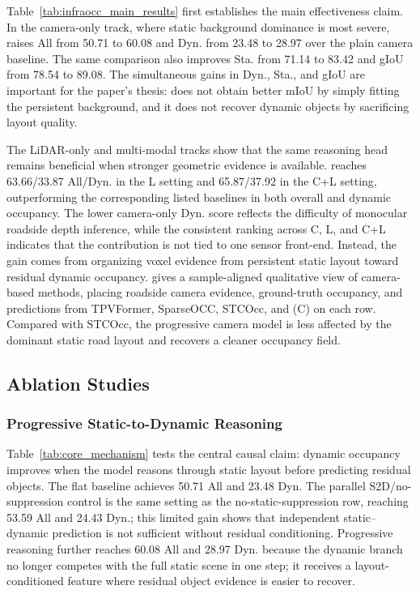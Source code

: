 Table~\ref{tab:infraocc_main_results} first establishes the main effectiveness
claim. In the camera-only track, where static background dominance is most
severe, \nameplus{} raises All from 50.71 to 60.08 and Dyn. from 23.48 to
28.97 over the plain camera baseline. The same comparison also improves Sta.
from 71.14 to 83.42 and gIoU from 78.54 to 89.08. The simultaneous gains in
Dyn., Sta., and gIoU are important for the paper's thesis: \nameplus{} does not
obtain better mIoU by simply fitting the persistent background, and it does not
recover dynamic objects by sacrificing layout quality.

The LiDAR-only and multi-modal tracks show that the same reasoning head remains
beneficial when stronger geometric evidence is available. \nameplus{} reaches
63.66/33.87 All/Dyn. in the L setting and 65.87/37.92 in the C+L setting,
outperforming the corresponding listed baselines in both overall and dynamic
occupancy. The lower camera-only Dyn. score reflects the difficulty of
monocular roadside depth inference, while the consistent ranking across C, L,
and C+L indicates that the contribution is not tied to one sensor front-end.
Instead, the gain comes from organizing voxel evidence from persistent static
layout toward residual dynamic occupancy.
 gives a sample-aligned qualitative
view of camera-based methods, placing roadside camera evidence, ground-truth
occupancy, and predictions from TPVFormer, SparseOCC, STCOcc, and \nameplus{}
(C) on each row. Compared with STCOcc, the progressive camera model is less
affected by the dominant static road layout and recovers a cleaner occupancy
field.





\subsection{Ablation Studies}
\subsubsection{Progressive Static-to-Dynamic Reasoning}
Table~\ref{tab:core_mechanism} tests the central causal claim: dynamic
occupancy improves when the model reasons through static layout before
predicting residual objects. The flat baseline achieves 50.71 All and 23.48
Dyn. The parallel S2D/no-suppression control is the same
setting as the no-static-suppression row, reaching 53.59 All and 24.43 Dyn.;
this limited gain shows that independent static--dynamic prediction is not
sufficient without residual conditioning.
Progressive reasoning further reaches 60.08 All and 28.97 Dyn. because the
dynamic branch no longer competes with the full static scene in one step; it
receives a layout-conditioned feature where residual object evidence is easier
to recover.

